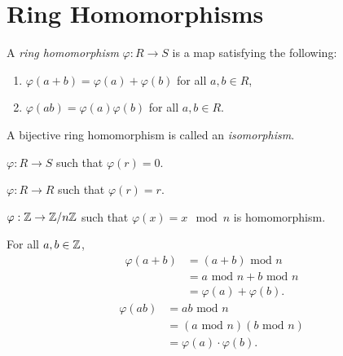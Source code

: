 \section{Ring Homomorphisms}
\begin{definition}
    A \textit{ring homomorphism} $\varphi: R \rightarrow S$ is a map satisfying the following:
    \begin{enumerate}
        \item $\varphi(a + b)  = \varphi(a)+ \varphi(b)$ for all $a, b \in R$,
        \item $\varphi(a b)  = \varphi(a)\varphi(b)$ for all $a, b \in R$.
    \end{enumerate}
\end{definition}
\begin{definition}[Isomorphism]
    A bijective ring homomorphism is called an \textit{isomorphism}.
\end{definition}
\begin{eg}
    $\varphi: R \rightarrow S$ such that $\varphi(r) = 0$.
\end{eg}
\begin{eg}
    $\varphi: R \rightarrow R$ such that $\varphi(r) = r$.
\end{eg}
\begin{eg}
    $\varphi: \mathbb{Z} \rightarrow \mathbb{Z}/n\mathbb{Z}$ such that $\varphi(x) = x \mod n$ is homomorphism.
\end{eg}
\begin{explanation}
    For all $a, b \in \mathbb{Z}$, 
    \begin{align*}
        \varphi(a + b)  &=(a+b) \text{ mod } n\\
                        &= a \text{ mod } n + b \text{ mod } n\\
                        &= \varphi(a) + \varphi(b).
    \end{align*}
    \begin{align*}
        \varphi(a b)  &= ab \text{ mod } n\\
                      &= (a \text{ mod } n) (b \text{ mod } n)\\
                      &= \varphi(a) \cdot \varphi(b).
    \end{align*}
\end{explanation}

